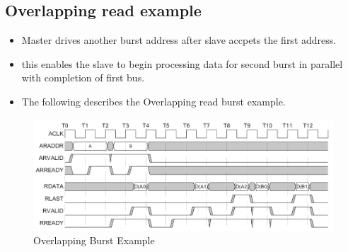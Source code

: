 \documentclass{article}
\begin{document}
\subsection{Overlapping read example}
\begin{itemize}
    \item Master drives another burst address after slave accpets the first address.
    \item this enables the slave to begin processing data for second burst in parallel with completion of first bus.
    \item The following describes the Overlapping read burst example.
\end{itemize}
\begin{figure}[H]
    \centering
    \includegraphics[width=1\textwidth]{./Resources/overlappingBurstExample.png}    
    \caption{Overlapping Burst Example}
\end{figure}
\end{document}
